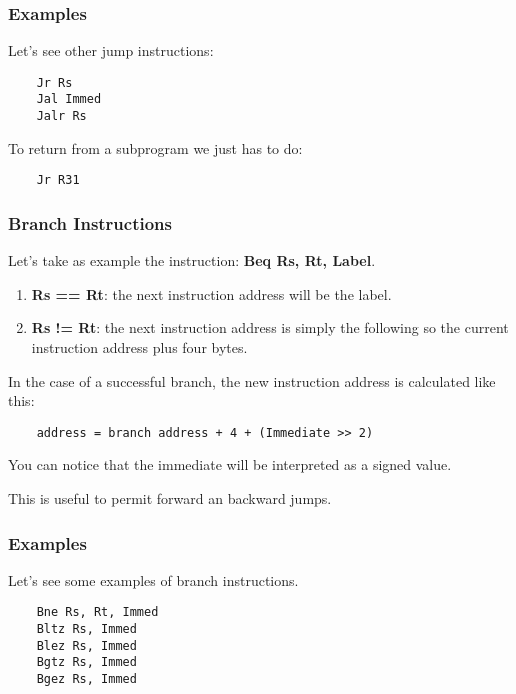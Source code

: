 
\begin{frame}[containsverbatim]
  \frametitle{Examples}

  Let's see other jump instructions:

  \begin{verbatim}
    Jr Rs
    Jal Immed
    Jalr Rs
  \end{verbatim}

  To return from a subprogram we just has to do:

  \begin{verbatim}
    Jr R31
  \end{verbatim}
\end{frame}


\begin{frame}[containsverbatim]
  \frametitle{Branch Instructions}

  Let's take as example the instruction: \textbf{Beq Rs, Rt, Label}.

  \begin{enumerate}
    \item
      \textbf{Rs == Rt}: the next instruction address will be the label.
    \item
      \textbf{Rs != Rt}: the next instruction address is simply the following
      so the current instruction address plus four bytes.
  \end{enumerate}

  \nl

  In the case of a successful branch, the new instruction address is
  calculated like this:

  \begin{verbatim}
    address = branch address + 4 + (Immediate >> 2)
  \end{verbatim}

  You can notice that the immediate will be interpreted as a signed value.

  \nl

  This is useful to permit forward an backward jumps.
\end{frame}


\begin{frame}[containsverbatim]
  \frametitle{Examples}

  Let's see some examples of branch instructions.

  \begin{verbatim}
    Bne Rs, Rt, Immed
    Bltz Rs, Immed
    Blez Rs, Immed
    Bgtz Rs, Immed
    Bgez Rs, Immed
  \end{verbatim}
\end{frame}

